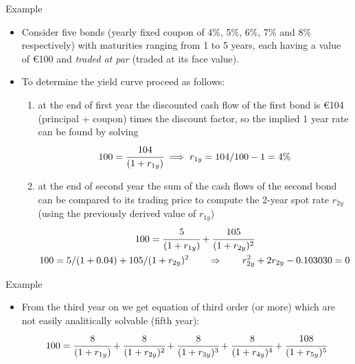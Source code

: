 \documentclass{beamer}
\begin{document}
\begin{frame}[fragile]{Example}
\begin{itemize}
\item Consider five bonds (yearly fixed coupon of 4\%, 5\%, 6\%, 7\% and 8\% respectively) with maturities ranging from 1 to 5 years, each having a value of €100 and \emph{traded at par} (traded at its face value). 
\item To determine the yield curve proceed as follows:
\begin{enumerate}
   \item at the end of first year the discounted cash flow of the first bond is €104 (principal + coupon) times the discount factor, so the implied 1 year rate can be found by solving
   \begin{equation*}
 100 = \cfrac{104}{(1 + r_{1y})}\implies r_{1y} =  104/100 - 1 = 4\%
 \end{equation*}
 \item at the end of second year the sum of the cash flows of the second bond can be compared to its trading price to compute the 2-year spot rate $r_{2y}$ (using the previously derived value of $r_{1y}$)
    \begin{equation*}
    \begin{gathered}
 100 = \cfrac{5}{(1 + r_{1y})} + \cfrac{105}{(1 + r_{2y})^{2}} \\
 100 = 5 / (1 + 0.04) + 105 / (1 + r_{2y})^{2}\qquad\Rightarrow\qquad r_{2y}^2  + 2 r_{2y}  - 0.103030 = 0
 \end{gathered}
 \end{equation*}
 \end{enumerate}
 \end{itemize}
\end{frame}
 
\begin{frame}[fragile]{Example}
\begin{itemize}
 This second order equation can be solved either by hand or with \texttt{numpy.roots}.
 \begin{equation*}
    r_{2y} = - 1 \pm \sqrt{1 + 0.103030} = \begin{cases}-2.05023 \\ 0.0502\end{cases}
    \end{equation*}
    
 \begin{ipython}
import numpy as np
np.roots([1, 2, -0.103030])
\end{ipython}
\begin{ioutput}
array([-2.05025235,  0.05025235])
\end{ioutput}
\item From the third year on we get equation of third order (or more) which are not easily analitically solvable (fifth year):
 \begin{equation*}
 100 = \cfrac{8} {(1 + r_{1y})} + \cfrac{8} {(1 + r_{2y})^{2}}+ \cfrac{8} {(1 + r_{3y})^{3}} + \cfrac{8} {(1 + r_{4y})^{4}} + \cfrac{108} {(1 + r_{5y})^{5}}
 \end{equation*}
\end{itemize}
\end{frame}  
 
\end{document}
